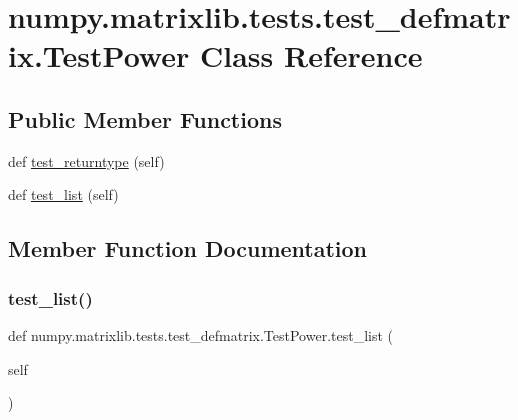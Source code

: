 \hypertarget{classnumpy_1_1matrixlib_1_1tests_1_1test__defmatrix_1_1TestPower}{}\section{numpy.\+matrixlib.\+tests.\+test\+\_\+defmatrix.\+Test\+Power Class Reference}
\label{classnumpy_1_1matrixlib_1_1tests_1_1test__defmatrix_1_1TestPower}
\subsection*{Public Member Functions}
\begin{DoxyCompactItemize}
\item 
def \hyperlink{classnumpy_1_1matrixlib_1_1tests_1_1test__defmatrix_1_1TestPower_a60260d81ace97f40a58b9e6e1d74e04d}{test\+\_\+returntype} (self)
\item 
def \hyperlink{classnumpy_1_1matrixlib_1_1tests_1_1test__defmatrix_1_1TestPower_a6e7fe097220dfb8af0773a01be602497}{test\+\_\+list} (self)
\end{DoxyCompactItemize}


\subsection{Member Function Documentation}
\mbox{\label{classnumpy_1_1matrixlib_1_1tests_1_1test__defmatrix_1_1TestPower_a6e7fe097220dfb8af0773a01be602497}} 
\subsubsection{\texorpdfstring{test\+\_\+list()}{test\_list()}}
{\footnotesize\ttfamily def numpy.\+matrixlib.\+tests.\+test\+\_\+defmatrix.\+Test\+Power.\+test\+\_\+list (\begin{DoxyParamCaption}\item[{}]{self }\end{DoxyParamCaption})}


